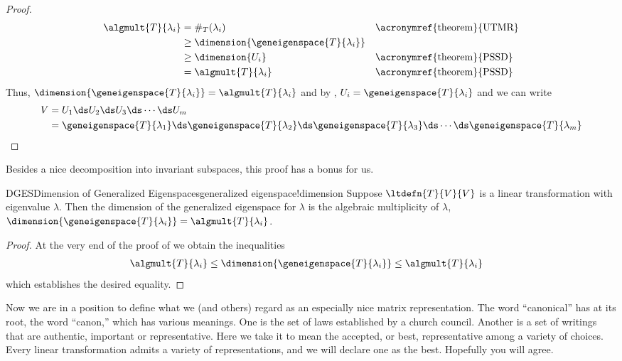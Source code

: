 \begin{proof}
%
\begin{align*}
\algmult{T}{\lambda_i}
&=\#_T(\lambda_i)&&\text{\acronymref{theorem}{UTMR}}\\
&\geq\dimension{\geneigenspace{T}{\lambda_i}}\\
&\geq\dimension{U_i}&&\text{\acronymref{theorem}{PSSD}}\\
&=\algmult{T}{\lambda_i}&&\text{\acronymref{theorem}{PSSD}}\\
\end{align*}
%
Thus, $\dimension{\geneigenspace{T}{\lambda_i}}=\algmult{T}{\lambda_i}$ and by 
, $U_i=\geneigenspace{T}{\lambda_i}$ and we can write
%
\begin{align*}
V&=U_1\ds U_2\ds U_3\ds\cdots\ds U_m\\
&=
\geneigenspace{T}{\lambda_1}\ds
\geneigenspace{T}{\lambda_2}\ds
\geneigenspace{T}{\lambda_3}\ds
\cdots\ds
\geneigenspace{T}{\lambda_m}
\end{align*}
%
\end{proof}
%
Besides a nice decomposition into invariant subspaces, this proof has a bonus for us.
%
\begin{theorem}{DGES}{Dimension of Generalized Eigenspaces}{generalized eigenspace!dimension}
Suppose $\ltdefn{T}{V}{V}$ is a linear transformation with eigenvalue $\lambda$.  Then the dimension of the generalized eigenspace for $\lambda$ is the algebraic multiplicity of $\lambda$, $\dimension{\geneigenspace{T}{\lambda_i}}=\algmult{T}{\lambda_i}$.
\end{theorem}
%
\begin{proof}
At the very end of the proof of  we obtain the inequalities
%
\begin{align*}
\algmult{T}{\lambda_i}
&\leq\dimension{\geneigenspace{T}{\lambda_i}}
\leq\algmult{T}{\lambda_i}
\end{align*}
%
which establishes the desired equality.
%
\end{proof}
%
%
Now we are in a position to define what we (and others) regard as an especially nice matrix representation.  The word ``canonical'' has at its root, the word ``canon,'' which has various meanings.  One is the set of laws established by a church council.  Another is a set of writings that are authentic, important or representative.  Here we take it to mean the accepted, or best, representative among a variety of choices.  Every linear transformation admits a variety of representations, and we will declare one as the best.  Hopefully you will agree.

